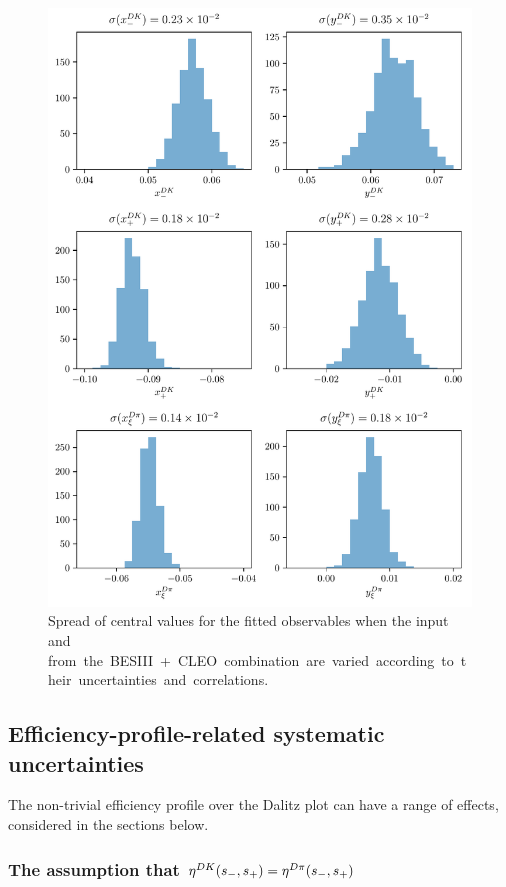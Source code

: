 \begin{figure}[tb]
    \centering
    \includegraphics[width=0.7\columnwidth]{figures/analysis/systematics/strong_phase_variation.pdf}
    \caption{Spread of central values for the fitted observables when the input \ci and \si from the BESIII+CLEO combination are varied according to their uncertainties and correlations. 
    }
    \label{fig:cisi_variation}
\end{figure}


\subsection{Efficiency-profile-related systematic uncertainties} %
\label{sub:efficiency_profile_related_systematic_uncertainties}

The non-trivial efficiency profile over the Dalitz plot can have a range of effects, considered in the sections below.


\subsubsection{The assumption that \texorpdfstring{$\eta^{{D}{K}}(s_-, s_+) = \eta^{{D}\pi}(s_-, s_+)$}{etaDK = etaDpi}}

